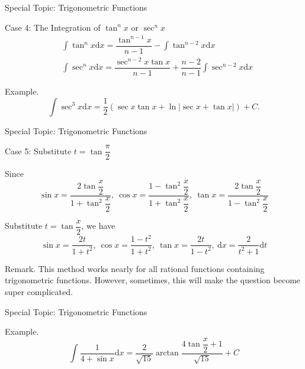 \documentclass{beamer}
\begin{document}
    \begin{frame}[t]{Special Topic: Trigonometric Functions}
        \begin{block}{Case 4: The Integration of $\tan^nx$ or $\sec^nx$}
            \begin{equation*}\begin{aligned}
                & \int \tan ^{n} x \mathrm{d} x=\dfrac{\tan ^{n-1} x}{n-1}-\int \tan ^{n-2} x \mathrm{d} x \\
                & \int \sec ^{n} x \mathrm{d} x=\dfrac{\sec ^{n-2} x \tan x}{n-1}+\dfrac{n-2}{n-1} \int \sec ^{n-2} x \mathrm{d} x
            \end{aligned}\end{equation*}
        \end{block}
        
        \par \textcolor{yy}{Example.} $$\int \sec^3 x\mathrm{d}x = \dfrac{1}{2}\left(\sec x\tan x+\ln\left|\sec x+\tan x \right|\right)+C.$$
    \end{frame}

    \begin{frame}[t]{Special Topic: Trigonometric Functions}
        \begin{block}{Case 5: Substitute $t = \tan \dfrac{\pi}{2}$}
            \par Since  $$\sin x=\dfrac{2 \tan \dfrac{x}{2}}{1+\tan ^{2} \dfrac{x}{2}},\ \cos x=\dfrac{1-\tan ^{2} \dfrac{x}{2}}{1+\tan ^{2} \dfrac{x}{2}},\ \tan x=\dfrac{2 \tan \dfrac{x}{2}}{1-\tan ^{2} \dfrac{x}{2}}$$
            \par Substitute $t=\tan \dfrac{x}{2}$, we have $$\sin x=\dfrac{2 t}{1+t^2},\ \cos x=\dfrac{1-t^2}{1+t^2},\ \tan x=\dfrac{2 t}{1-t^2},\ \mathrm{d}x=\dfrac{2}{t^2+1}\mathrm{d}t$$
        \end{block}
        \par \textcolor{yy}{Remark.} This method works nearly for all rational functions containing trigonometric functions. {However}, sometimes, this will make the question become {super} {complicated}.
    \end{frame}
 
    \begin{frame}[t]{Special Topic: Trigonometric Functions}
        \par \textcolor{yy}{Example.} $$\int \dfrac{1}{4+\sin x} \mathrm{d} x =\dfrac{2}{\sqrt{15}} \arctan \dfrac{4 \tan \dfrac{x}{2}+1}{\sqrt{15}}+C$$
    \end{frame}
\end{document}
